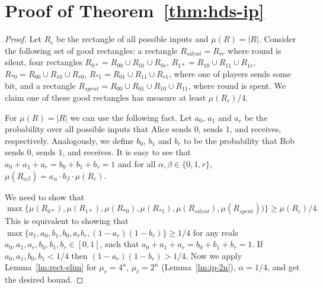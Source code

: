 \section{Proof of Theorem~\ref{thm:hds-ip}}
\begin{proof}
	Let $R_c$ be the rectangle of all possible inputs and $\mu(R) = |R|$.
	Consider the following set of good rectangles: a rectangle $R_{silent} = R_{rr}$
	where round is silent,
	four rectangles
	$R_{0*} = R_{00} \cup R_{01} \cup R_{0r}$,
	$R_{1*} = R_{10} \cup R_{11} \cup R_{1r}$,
	$R_{*0} = R_{00} \cup R_{10} \cup R_{r0}$,
	$R_{*1} = R_{01} \cup R_{11} \cup R_{r1}$,
	where one of players sends some bit, 
	and a rectangle $R_{spent} = R_{00} \cup R_{01} \cup R_{10} \cup R_{11}$, where round is spent.
	We claim one of these good rectangles has measure at least $\mu(R_c)/4$. 
	
	For $\mu(R) = |R|$ we can use the following fact.
	Let $a_0$, $a_1$ and $a_r$ be the probability over all possible inputs that Alice sends $0$,
	sends $1$, and receives, respectively. 
	Analogously, we define $b_0$, $b_1$ and $b_r$ 
	to be the probability that Bob sends $0$,
	sends $1$, and receives.
	It is easy to see that $a_0+a_1+a_r = b_0+b_1+b_r = 1$ and 
	for all $\alpha,\beta \in \{0,1,r\}$, $\mu(R_{\alpha\beta}) = a_\alpha\cdot b_\beta\cdot \mu(R_c)$.
	
	We need to show that 
	$\max\bigl\{ \mu(R_{0*}),\mu(R_{1*}),\mu(R_{*0}),\mu(R_{*1}),\mu(R_{silent}),\mu(R_{spent}))\bigr\}\ge \mu(R_c)/4.$ This is equivalent to showing that
	$\max\bigl\{a_1,a_0,b_1,b_0,a_r b_r,(1-a_r)(1-b_r)\bigr\}\ge 1/4$ for any reals  $a_0,a_1,a_r,b_0,b_1,b_r\in[0,1]$, such that $a_0+a_1+a_r = b_0+b_1+b_r = 1$. 
	If $a_0, a_1, b_0, b_1 < 1/4$ then $(1-a_r)(1-b_r)> 1/4$. Now we apply Lemma~\ref{lm:rect-elim} for $\mu_r = 4^n$, $\mu_\ell = 2^n$ (Lemma~\ref{lm:ip-2n}), $\alpha = 1/4$, and get the desired bound.
\end{proof}


